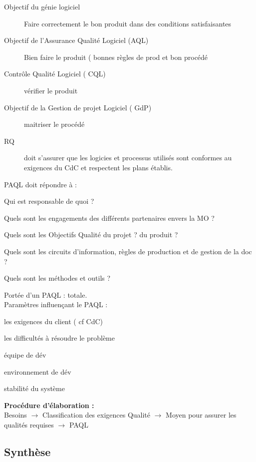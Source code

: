 	\begin{description}
	\item[Objectif du génie logiciel] Faire correctement le bon produit dans des conditions satisfaisantes
	\item[Objectif de l’Assurance Qualité Logiciel (AQL)] Bien faire le produit ( bonnes règles de prod et bon procédé
	\item[Contrôle Qualité Logiciel ( CQL)] vérifier le produit
	\item[Objectif de la Gestion de projet Logiciel ( GdP)] maitriser le procédé

	\item[RQ] doit s’assurer que les logicies et processus utilisés sont conformes au exigences du CdC et respectent les plans établis.
	\end{description}

	PAQL doit répondre à :
	\begin{description}
	\item Qui est responsable de quoi ?
	\item Quels sont les engagements des différents partenaires envers la MO ?
	\item Quels sont les Objectifs Qualité du projet ? du produit ?
	\item Quels sont les circuits d’information, règles de production et de gestion de la doc ?
	\item Quels sont les méthodes et outils ?
	\end{description}

Portée d’un PAQL : totale.\\

Paramètres influençant le PAQL :
	\begin{description}
	\item les exigences du client ( cf CdC)
	\item les difficultés à résoudre le problème
	\item équipe de dév
	\item environnement de dév
	\item stabilité du système
	\end{description}

\textbf{Procédure d’élaboration :}\hfill\\
	Besoins $\rightarrow$ Classification des exigences Qualité $\rightarrow$ Moyen pour assurer les qualités requises $\rightarrow$ PAQL

	\subsection{Synthèse}
	
